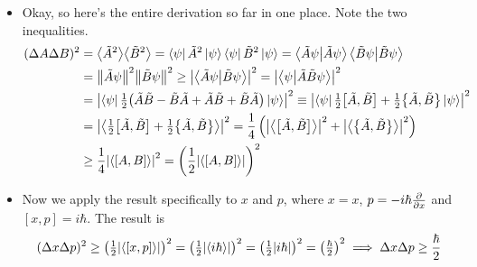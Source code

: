 \documentclass[11pt, a4paper]{article}
\begin{document}
\begin{itemize}
	\item Okay, so here's the entire derivation so far in one place. Note the two inequalities.
	\begin{align*}
		(\Delta A \Delta B)^{2} &= \big\langle \tilde{A}^{2} \big\rangle \big\langle \tilde{B}^{2} \big\rangle = \bra{\psi}\tilde{A}^{2}\ket{\psi} \bra{\psi}\tilde{B}^{2}\ket{\psi} = \braket{\tilde{A}\psi}{\tilde{A}\psi}\braket{\tilde{B}\psi}{\tilde{B}\psi}\\
		&= \norm{\tilde{A}\psi}^{2}\norm{\tilde{B}\psi}^{2} \geq \abs{\braket{\tilde{A}\psi}{\tilde{B}\psi}}^{2} = \abs{\braket{\psi}{\tilde{A}\tilde{B}\psi}}^{2}\\
		& = \abs{\bra{\psi}\tfrac{1}{2}\big(\tilde{A}\tilde{B} - \tilde{B}\tilde{A} + \tilde{A}\tilde{B} + \tilde{B}\tilde{A}\big)\ket{\psi} }^{2} \equiv  \abs{\bra{\psi}\tfrac{1}{2}\big[\tilde{A}, \tilde{B}\big] + \tfrac{1}{2}\big\{ \tilde{A}, \tilde{B}\big\}\ket{\psi} }^{2} \\
		& = \abs{\left\langle \tfrac{1}{2}\big[\tilde{A}, \tilde{B}\big] + \tfrac{1}{2}\big\{ \tilde{A}, \tilde{B}\big\} \right\rangle}^{2} = \frac{1}{4}\left(\abs{\big\langle \big[\tilde{A}, \tilde{B}\big] \big\rangle}^{2} + \abs{\big\langle \big\{\tilde{A}, \tilde{B}\big\} \big\rangle}^{2}\right) \\
		& \geq \frac{1}{4}\abs{\ev{[A, B]}}^{2} = \left(\frac{1}{2}\abs{\ev{[A, B]}}\right)^{2}
	\end{align*}
	
	\item Now we apply the result specifically to $ x $ and $ p $, where $ x = x $, $ p = -i\hbar \pdv{}{x} $ and $ [x, p] = i \hbar $. The result is
	\begin{equation*}
		(\Delta x \Delta p)^{2} \geq \left(\tfrac{1}{2}\abs{\langle [x, p] \rangle}\right)^{2} = \left(\tfrac{1}{2}\abs{\langle i \hbar \rangle}\right)^{2} = \left(\tfrac{1}{2}\abs{i\hbar}\right)^{2} = \left(\tfrac{\hbar}{2}\right)^{2} \implies \Delta x \Delta p \geq \frac{\hbar}{2}
	\end{equation*}

\end{itemize}
\end{document}
